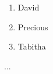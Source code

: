 \documentclass{article}
\begin{document}
	\begin{enumerate}
		\item David
		\item Precious
		\item Tabitha
	\end{enumerate}...
\end{document}
